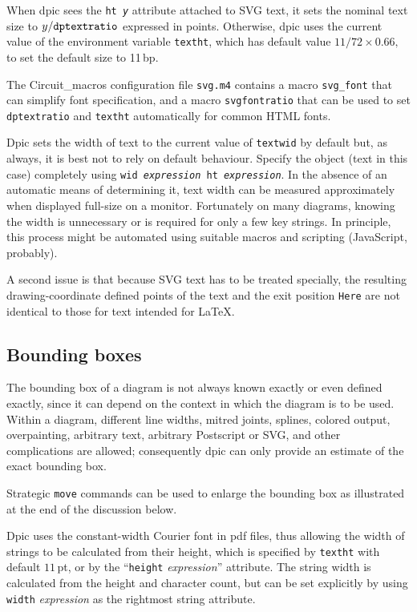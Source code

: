 \documentclass[11pt]{article}
\newcommand{\bq}{}
\newcommand{\Dpic}{{\bq Dpic}\xspace}
\newcommand{\Postscript}{{\bq Postscript}\xspace}
\newcommand{\dpic}{{\bq dpic}\xspace}
\begin{document}
  When \dpic sees the {\tt ht {\it y}} attribute attached to SVG text,
  it sets the nominal text size
  to $y/\tt{dptextratio}$ expressed in points.
  Otherwise, \dpic uses the current value of the environment
  variable {\tt textht}, which has default value $11/72 \times 0.66,$
  to set the default size to 11\,bp.

  The Circuit\_macros configuration file {\tt svg.m4} contains a macro
  {\tt svg\_font} that can simplify font specification, and a macro
  {\tt svgfontratio} that can be used to set {\tt dptextratio} and
  {\tt textht} automatically for common HTML fonts.

  \Dpic sets the width of text
  to the current value of {\tt textwid} by default but,
  as always, it is best not to rely on
  default behaviour. Specify the object (text in this case) completely
  using {\tt wid {\it expression} ht {\it expression}}.
  In the absence of an automatic means of determining it, text width can
  be measured approximately when displayed full-size on a monitor.
  Fortunately on many diagrams, knowing the width is unnecessary or
  is required for only a few key strings.
  In principle, this process might be automated using suitable macros
  and scripting (JavaScript, probably).

  A second issue is that because SVG text has to be treated specially,
  the resulting drawing-coordinate defined points of the text and the
  exit position {\tt Here} are not identical to those for text intended
  for LaTeX.

\enlargethispage{\baselineskip}
\subsection{Bounding boxes}
  The bounding box of a diagram is not always known exactly or even defined
  exactly, since it can depend on the context in which the diagram is to be
  used.  Within a diagram, different line widths, mitred joints, splines,
  colored output, overpainting, arbitrary text, arbitrary \Postscript or SVG,
  and other complications are allowed; consequently dpic can only provide an
  estimate of the exact bounding box.

  Strategic {\tt move} commands can be used
  to enlarge the bounding box as illustrated at the end of the discussion
  below.

  Dpic uses the constant-width Courier font in pdf files, thus allowing
  the width of strings to be calculated from their height, which is
  specified by {\tt textht} with default $11\,$pt, or by the
  ``{\tt height} {\sl expression}'' attribute.  The string width is calculated
  from the height and character count, but can be set explicitly
  by using {\tt width} {\sl expression} as the rightmost string attribute.
\end{document}
